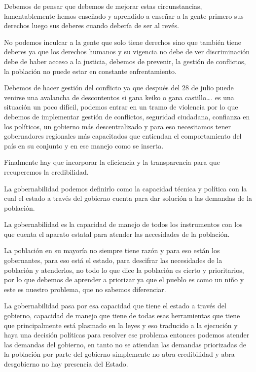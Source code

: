 \documentclass[
  a4paper,
]{article}
\begin{document}
Debemos de pensar que debemos de mejorar estas circunstancias,
lamentablemente hemos enseñado y aprendido a enseñar a la gente primero
sus derechos luego sus deberes cuando debería de ser al revés.

No podemos inculcar a la gente que solo tiene derechos sino que también
tiene deberes ya que los derechos humanos y su vigencia no debe de ver
discriminación debe de haber acceso a la justicia, debemos de prevenir,
la gestión de conflictos, la población no puede estar en constante
enfrentamiento.

Debemos de hacer gestión del conflicto ya que después del 28 de julio
puede venirse una avalancha de descontentos si gana keiko o gana
castillo\ldots. es una situación un poco difícil, podemos entrar en un
tramo de violencia por lo que debemos de implementar gestión de
conflictos, seguridad ciudadana, confianza en los políticos, un gobierno
más descentralizado y para eso necesitamos tener gobernadores regionales
más capacitados que entiendan el comportamiento del país en su conjunto
y en ese manejo como se inserta.

Finalmente hay que incorporar la eficiencia y la transparencia para que
recuperemos la credibilidad.

La gobernabilidad podemos definirlo como la capacidad técnica y política
con la cual el estado a través del gobierno cuenta para dar solución a
las demandas de la población.

La gobernabilidad es la capacidad de manejo de todos los instrumentos
con los que cuenta el aparato estatal para atender las necesidades de la
población.

La población en su mayoría no siempre tiene razón y para eso están los
gobernantes, para eso está el estado, para descifrar las necesidades de
la población y atenderlos, no todo lo que dice la población es cierto y
prioritarios, por lo que debemos de aprender a priorizar ya que el
pueblo es como un niño y este es nuestro problema, que no sabemos
diferenciar.

La gobernabilidad pasa por esa capacidad que tiene el estado a través
del gobierno, capacidad de manejo que tiene de todas esas herramientas
que tiene que principalmente está plasmado en la leyes y eso traducido a
la ejecución y haya una decisión políticas para resolver ese problema
entonces podemos atender las demandas del gobierno, en tanto no se
atiendan las demandas priorizadas de la población por parte del gobierno
simplemente no abra credibilidad y abra desgobierno no hay presencia del
Estado.
\end{document}
